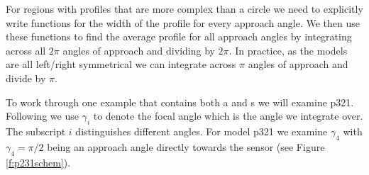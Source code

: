 \documentclass[a4paper,10pt,reqno,oneside]{amsart}
\begin{document}
For regions with profiles that are more complex than a circle we need to explicitly write functions for the width of the profile for every approach angle. We then use these functions to find the average profile for all approach angles by integrating across all $2\pi$ angles of approach and dividing by $2\pi$. In practice, as the models are all left/right symmetrical we can integrate across $\pi$ angles of approach and divide by $\pi$.

To work through one example that contains both a and s we will examine p321. Following \citep{rowcliffe2008estimating} we use $\gamma_i$ to denote the focal angle which is the angle we integrate over. The subscript $i$ distinguishes different angles. For model p321 we examine $\gamma_4$ with  $\gamma_4 = \pi/2$ being an approach angle directly towards the sensor (see Figure \ref{f:p231schem}).
\end{document}
